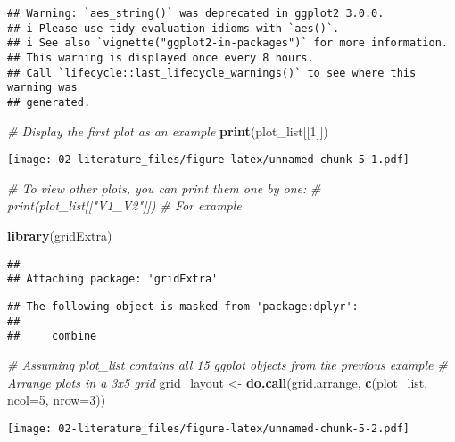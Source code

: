 \documentclass[
]{article}
\newenvironment{Shaded}{\begin{snugshade}}{\end{snugshade}}
\newcommand{\AttributeTok}[1]{\textcolor[rgb]{0.13,0.29,0.53}{#1}}
\newcommand{\CommentTok}[1]{\textcolor[rgb]{0.56,0.35,0.01}{\textit{#1}}}
\newcommand{\DecValTok}[1]{\textcolor[rgb]{0.00,0.00,0.81}{#1}}
\newcommand{\FunctionTok}[1]{\textcolor[rgb]{0.13,0.29,0.53}{\textbf{#1}}}
\newcommand{\NormalTok}[1]{#1}
\newcommand{\OtherTok}[1]{\textcolor[rgb]{0.56,0.35,0.01}{#1}}
\begin{document}
\begin{verbatim}
## Warning: `aes_string()` was deprecated in ggplot2 3.0.0.
## i Please use tidy evaluation idioms with `aes()`.
## i See also `vignette("ggplot2-in-packages")` for more information.
## This warning is displayed once every 8 hours.
## Call `lifecycle::last_lifecycle_warnings()` to see where this warning was
## generated.
\end{verbatim}

\begin{Shaded}
\begin{Highlighting}[]
\CommentTok{\# Display the first plot as an example}
\FunctionTok{print}\NormalTok{(plot\_list[[}\DecValTok{1}\NormalTok{]])}
\end{Highlighting}
\end{Shaded}

\texttt{[image: 02-literature\_files/figure-latex/unnamed-chunk-5-1.pdf]}

\begin{Shaded}
\begin{Highlighting}[]
\CommentTok{\# To view other plots, you can print them one by one:}
\CommentTok{\# print(plot\_list[["V1\_V2"]]) \# For example}

\FunctionTok{library}\NormalTok{(gridExtra)}
\end{Highlighting}
\end{Shaded}

\begin{verbatim}
## 
## Attaching package: 'gridExtra'
\end{verbatim}

\begin{verbatim}
## The following object is masked from 'package:dplyr':
## 
##     combine
\end{verbatim}

\begin{Shaded}
\begin{Highlighting}[]
\CommentTok{\# Assuming \textquotesingle{}plot\_list\textquotesingle{} contains all 15 ggplot objects from the previous example}
\CommentTok{\# Arrange plots in a 3x5 grid}
\NormalTok{grid\_layout }\OtherTok{\textless{}{-}} \FunctionTok{do.call}\NormalTok{(grid.arrange, }\FunctionTok{c}\NormalTok{(plot\_list, }\AttributeTok{ncol=}\DecValTok{5}\NormalTok{, }\AttributeTok{nrow=}\DecValTok{3}\NormalTok{))}
\end{Highlighting}
\end{Shaded}

\texttt{[image: 02-literature\_files/figure-latex/unnamed-chunk-5-2.pdf]}
\end{document}
